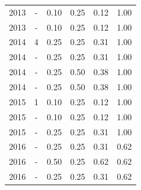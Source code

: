 \begin{table}[H]
\begin{tabular}{| l | c | c | c | c | c |}
            2013
          &
          -
          &
          0.10
          &
          0.25
          &
          0.12
          &
            {\color{blue} 1.00}
          \\
            2013
          &
          -
          &
          0.10
          &
          0.25
          &
          0.12
          &
            {\color{blue} 1.00}
          \\
\hline
            2014
          &
          4
          &
          0.25
          &
          0.25
          &
          0.31
          &
            {\color{blue} 1.00}
          \\
            2014
          &
          -
          &
          0.25
          &
          0.25
          &
          0.31
          &
            {\color{blue} 1.00}
          \\
            2014
          &
          -
          &
          0.25
          &
          0.50
          &
          0.38
          &
            {\color{blue} 1.00}
          \\
            2014
          &
          -
          &
          0.25
          &
          0.50
          &
          0.38
          &
            {\color{blue} 1.00}
          \\
\hline
            2015
          &
          1
          &
          0.10
          &
          0.25
          &
          0.12
          &
            {\color{blue} 1.00}
          \\
            2015
          &
          -
          &
          0.10
          &
          0.25
          &
          0.12
          &
            {\color{blue} 1.00}
          \\
            2015
          &
          -
          &
          0.25
          &
          0.25
          &
          0.31
          &
            {\color{blue} 1.00}
          \\
\hline
            2016
          &
          -
          &
          0.25
          &
          0.25
          &
          0.31
          &
            {\color{blue} 0.62}
          \\
            2016
          &
          -
          &
          0.50
          &
          0.25
          &
          0.62
          &
            {\color{blue} 0.62}
          \\
            2016
          &
          -
          &
          0.25
          &
          0.25
          &
          0.31
          &
            {\color{blue} 0.62}
          \\

\end{tabular}
\end{table}
